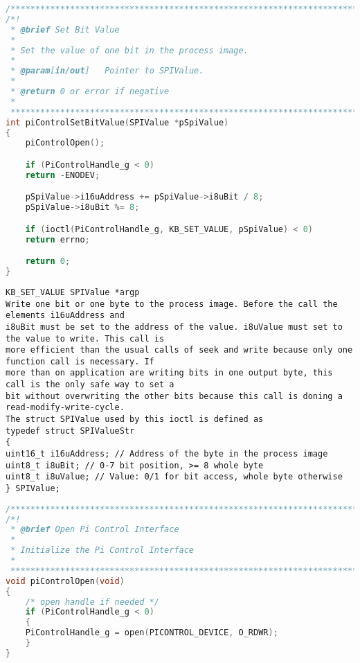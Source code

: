 \begin{lstlisting}[language={c},firstnumber=301,caption={Methode piControlSetBitValue in piControlIf.c\label{lst:4-piControlSetBitValue(}}]
/***********************************************************************************/
/*!
 * @brief Set Bit Value
 *
 * Set the value of one bit in the process image.
 *
 * @param[in/out]   Pointer to SPIValue.
 *
 * @return 0 or error if negative
 *
 ************************************************************************************/
int piControlSetBitValue(SPIValue *pSpiValue)
{
    piControlOpen();

    if (PiControlHandle_g < 0)
	return -ENODEV;

    pSpiValue->i16uAddress += pSpiValue->i8uBit / 8;
    pSpiValue->i8uBit %= 8;

    if (ioctl(PiControlHandle_g, KB_SET_VALUE, pSpiValue) < 0)
	return errno;

    return 0;
}
\end{lstlisting}
\begin{lstlisting}[numbers=none,caption={Auszug aus der RevolutionPi Programmers Manual\label{lst:4-manpage}}]
KB_SET_VALUE SPIValue *argp
Write one bit or one byte to the process image. Before the call the elements i16uAddress and
i8uBit must be set to the address of the value. i8uValue must set to the value to write. This call is
more efficient than the usual calls of seek and write because only one function call is necessary. If
more than on application are writing bits in one output byte, this call is the only safe way to set a
bit without overwriting the other bits because this call is doning a read-modify-write-cycle.
The struct SPIValue used by this ioctl is defined as
typedef struct SPIValueStr
{
uint16_t i16uAddress; // Address of the byte in the process image
uint8_t i8uBit; // 0-7 bit position, >= 8 whole byte
uint8_t i8uValue; // Value: 0/1 for bit access, whole byte otherwise
} SPIValue;
\end{lstlisting}

\begin{lstlisting}[language={c},firstnumber=74,caption={Methode piControlOpen in piControlIf.c\label{lst:4-piControlOpen}}]
/***********************************************************************************/
/*!
 * @brief Open Pi Control Interface
 *
 * Initialize the Pi Control Interface
 *
 ************************************************************************************/
void piControlOpen(void)
{
    /* open handle if needed */
    if (PiControlHandle_g < 0)
    {
	PiControlHandle_g = open(PICONTROL_DEVICE, O_RDWR);
    }
}
\end{lstlisting}

